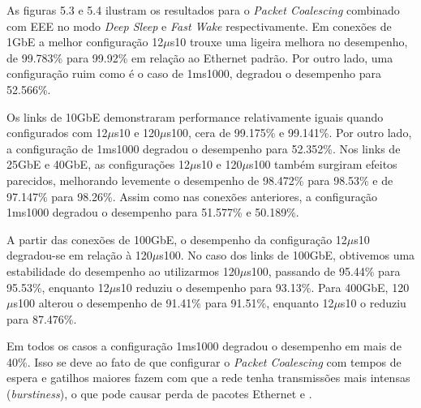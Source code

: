 As figuras 5.3 e 5.4 ilustram os resultados para o \emph{Packet Coalescing} combinado com EEE no modo \emph{Deep Sleep} e \emph{Fast Wake} respectivamente. Em conexões de 1GbE a melhor configuração 12$\mu$s10 trouxe uma ligeira melhora no desempenho, de 99.783\% para 99.92\% em relação ao Ethernet padrão. Por outro lado, uma configuração ruim como é o caso de 1ms1000, degradou o desempenho para 52.566\%.

Os links de 10GbE demonstraram performance relativamente iguais quando configurados com 12$\mu$s10 e 120$\mu$s100, cera de 99.175\% e 99.141\%. Por outro lado, a configuração de 1ms1000 degradou o desempenho para 52.352\%. Nos links de 25GbE e 40GbE, as configurações 12$\mu$s10 e 120$\mu$s100 também surgiram efeitos parecidos, melhorando levemente o desempenho de 98.472\% para 98.53\% e de 97.147\% para 98.26\%. Assim como nas conexões anteriores, a configuração 1ms1000 degradou o desempenho para 51.577\% e 50.189\%.

A partir das conexões de 100GbE, o desempenho da configuração 12$\mu$s10 degradou-se em relação à 120$\mu$s100. No caso dos links de 100GbE, obtivemos uma estabilidade do desempenho ao utilizarmos 120$\mu$s100, passando de 95.44\% para 95.53\%, enquanto 12$\mu$s10 reduziu o desempenho para 93.13\%. Para 400GbE, 120$\mu$s100 alterou o desempenho de 91.41\% para 91.51\%, enquanto 12$\mu$s10 o reduziu para 87.476\%.

Em todos os casos a configuração 1ms1000 degradou o desempenho em mais de 40\%. Isso se deve ao fato de que configurar o \emph{Packet Coalescing} com tempos de espera e gatilhos maiores fazem com que a rede tenha transmissões mais intensas (\emph{burstiness}), o que pode causar perda de pacotes Ethernet \cite{mostowfi2011saving} e \cite{silva2018eon}.

